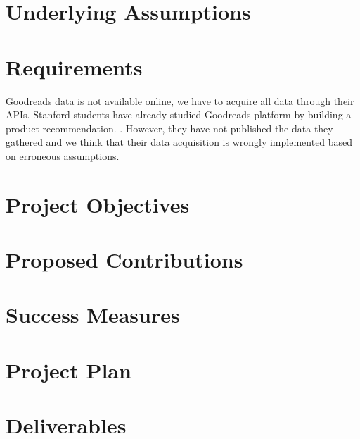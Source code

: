 \documentclass[12pt]{article}
\begin{document}
\section{Underlying Assumptions}
\section{Requirements}

Goodreads data is not available online, we have to acquire all data through their APIs. Stanford students have already studied Goodreads platform by building a product recommendation. \cite{stanford:goodreads}. However, they have not published the data they gathered and we think that their data acquisition is wrongly implemented based on erroneous assumptions.

\section{Project Objectives}
\section{Proposed Contributions}
\section{Success Measures}
\section{Project Plan}
\section{Deliverables}




\end{document}
